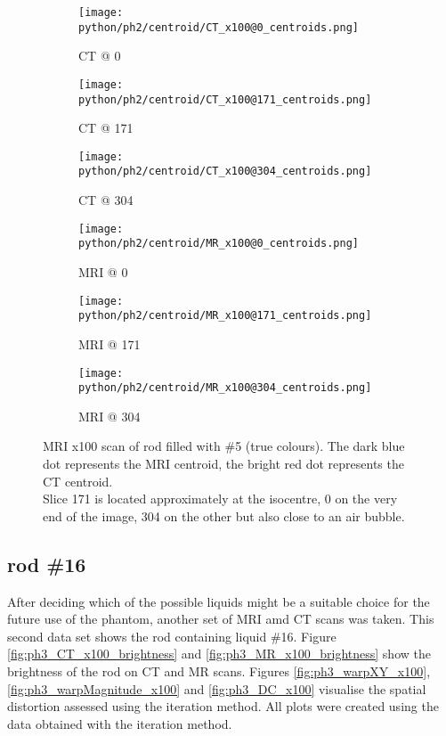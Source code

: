 \begin{figure}[!tbp]
  \begin{subfigure}[b]{0.32\textwidth}
    \texttt{[image: python/ph2/centroid/CT\_x100@0\_centroids.png]}
    \caption{CT @ 0}
    \label{fig:CT_x100_centroids@0}
  \end{subfigure}
  \begin{subfigure}[b]{0.32\textwidth}
    \texttt{[image: python/ph2/centroid/CT\_x100@171\_centroids.png]}
    \caption{CT @ 171}
    \label{fig:CT_x100_centroids@171}
  \end{subfigure}
  \begin{subfigure}[b]{0.32\textwidth}
    \texttt{[image: python/ph2/centroid/CT\_x100@304\_centroids.png]}
    \caption{CT @ 304}
    \label{fig:CT_x100_centroids@304}
  \end{subfigure}
  \begin{subfigure}[b]{0.32\textwidth}
    \texttt{[image: python/ph2/centroid/MR\_x100@0\_centroids.png]}
    \caption{MRI @ 0}
    \label{fig:MR_x100_centroids@0}
  \end{subfigure}
  \begin{subfigure}[b]{0.32\textwidth}
    \texttt{[image: python/ph2/centroid/MR\_x100@171\_centroids.png]}
    \caption{MRI @ 171}
    \label{fig:MR_x100_centroids@171}
  \end{subfigure}
  \begin{subfigure}[b]{0.32\textwidth}
    \texttt{[image: python/ph2/centroid/MR\_x100@304\_centroids.png]}
    \caption{MRI @ 304}
    \label{fig:MR_x100_centroids@304}
  \end{subfigure}
  \caption{MRI x100 scan of rod filled with \#5 (true colours). The dark blue dot represents the MRI centroid, the bright red dot represents the CT centroid.
  			\\ Slice 171 is located approximately at the isocentre, 0 on the very end of the image, 304 on the other but also close to an air bubble.}
  \label{fig:MR_x100_centroids}
\end{figure}

\clearpage

\subsection{rod \#16}

After deciding which of the possible liquids might be a suitable choice for the future use of the phantom, another set of MRI amd CT scans was taken.
This second data set shows the rod containing liquid \#16.
Figure \ref{fig:ph3_CT_x100_brightness} and \ref{fig:ph3_MR_x100_brightness} show the brightness of the rod on CT and MR scans.
Figures \ref{fig:ph3_warpXY_x100}, \ref{fig:ph3_warpMagnitude_x100} and \ref{fig:ph3_DC_x100} visualise the spatial distortion assessed using the iteration method.
All plots were created using the data obtained with the iteration method.


